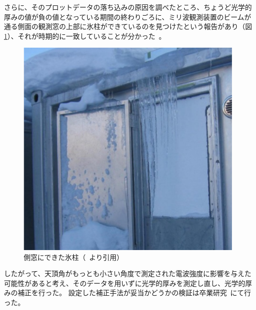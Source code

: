 さらに、そのプロットデータの落ち込みの原因を調べたところ、ちょうど光学的厚みの値が負の値となっている期間の終わりごろに、ミリ波観測装置のビームが通る側面の観測窓の上部に氷柱ができているのを見つけたという報告があり（図\ref{fig:icicles}）、それが時期的に一致していることが分かった~\cite{goto2021bachelor}。
\begin{figure}[htbp]
    \centering
    \includegraphics[width=\linewidth]{master_thesis_contents/master_thesis_fig/icicles.pdf}
    \caption{側窓にできた氷柱（~\cite{goto2021bachelor}より引用）}
    \label{fig:icicles}
\end{figure}
したがって、天頂角がもっとも小さい角度で測定された電波強度に影響を与えた可能性があると考え、そのデータを用いずに光学的厚みを測定し直し、光学的厚みの補正を行った。
設定した補正手法が妥当かどうかの検証は卒業研究~\cite{goto2021bachelor}にて行った。


